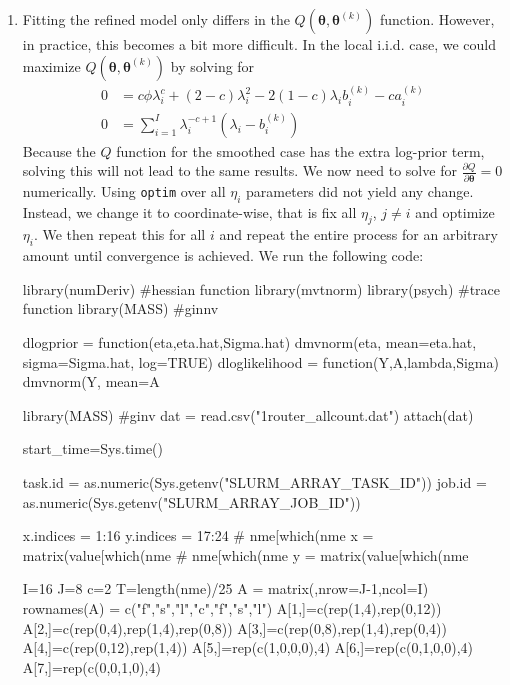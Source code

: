 \documentclass[letterpaper,10pt]{amsart}
\newenvironment{verbatimcode}{\bigskip \scriptsize \verbatim}{\endverbatim \normalsize \bigskip}
\begin{document}
\begin{enumerate}[{1}.1]
\item Fitting the refined model only differs in the $Q(\boldsymbol \theta, \boldsymbol \theta^{(k)})$ function. However, in practice, this becomes a bit more difficult. In the local i.i.d. case, we could maximize $Q(\boldsymbol \theta, \boldsymbol \theta^{(k)})$ by solving for
\begin{align*}
0 &= c \phi \lambda_i^c + (2-c)\lambda_i^2 - 2(1-c) \lambda_i b_i^{(k)} - c a_i^{(k)}\\
0 &= \sum_{i=1}^I \lambda_i^{-c+1} (\lambda_i - b_i^{(k)})
\end{align*}
Because the $Q$ function for the smoothed case has the extra log-prior term, solving this will not lead to the same results. We now need to solve for $\frac{\partial Q}{\partial \boldsymbol \theta}=0$ numerically. Using \texttt{optim} over all $\eta_i$ parameters did not yield any change. Instead, we change it to coordinate-wise, that is fix all $\eta_j$, $j \neq i$ and optimize $\eta_i$. We then repeat this for all $i$ and repeat the entire process for an arbitrary amount until convergence is achieved. We run the following code: 

\begin{verbatimcode}
library(numDeriv) #hessian function
library(mvtnorm)
library(psych) #trace function
library(MASS) #ginnv

dlogprior = function(eta,eta.hat,Sigma.hat)
{
  dmvnorm(eta, mean=eta.hat, sigma=Sigma.hat, log=TRUE)
}
dloglikelihood = function(Y,A,lambda,Sigma)
{
  dmvnorm(Y, mean=A %
}

library(MASS) #ginv
dat = read.csv("1router_allcount.dat")
attach(dat)

start_time=Sys.time()

task.id = as.numeric(Sys.getenv("SLURM_ARRAY_TASK_ID"))
job.id = as.numeric(Sys.getenv("SLURM_ARRAY_JOB_ID"))

x.indices = 1:16
y.indices = 17:24
# nme[which(nme %
x = matrix(value[which(nme %
# nme[which(nme %
y = matrix(value[which(nme %




I=16
J=8
c=2
T=length(nme)/25
A = matrix(,nrow=J-1,ncol=I)
rownames(A) = c("f","s","l","c","f","s","l")
A[1,]=c(rep(1,4),rep(0,12))
A[2,]=c(rep(0,4),rep(1,4),rep(0,8))
A[3,]=c(rep(0,8),rep(1,4),rep(0,4))
A[4,]=c(rep(0,12),rep(1,4))
A[5,]=rep(c(1,0,0,0),4)
A[6,]=rep(c(0,1,0,0),4)
A[7,]=rep(c(0,0,1,0),4)




\end{verbatimcode}
\end{enumerate}
\end{document}

